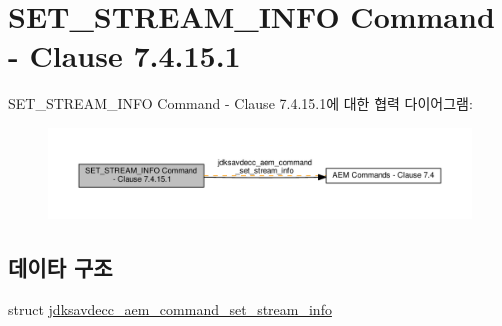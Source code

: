 \hypertarget{group__command__set__stream__info}{}\section{S\+E\+T\+\_\+\+S\+T\+R\+E\+A\+M\+\_\+\+I\+N\+FO Command -\/ Clause 7.4.15.1}
\label{group__command__set__stream__info}
S\+E\+T\+\_\+\+S\+T\+R\+E\+A\+M\+\_\+\+I\+N\+FO Command -\/ Clause 7.4.15.1에 대한 협력 다이어그램\+:
\nopagebreak
\begin{figure}[H]
\begin{center}
\leavevmode
\includegraphics[width=350pt]{group__command__set__stream__info}
\end{center}
\end{figure}
\subsection*{데이타 구조}
\begin{DoxyCompactItemize}
\item 
struct \hyperlink{structjdksavdecc__aem__command__set__stream__info}{jdksavdecc\+\_\+aem\+\_\+command\+\_\+set\+\_\+stream\+\_\+info}
\end{DoxyCompactItemize}
